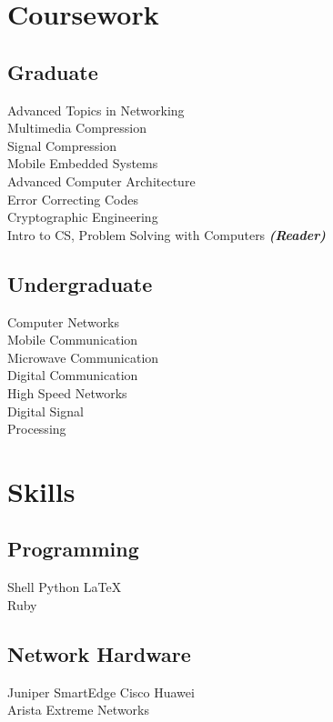 \documentclass[]{deedy-resume-openfont}
\begin{document}
\begin{minipage}[t]{0.33\textwidth}

\section{Coursework}
\subsection{Graduate}
Advanced Topics in Networking \\ Multimedia Compression \\ Signal Compression \\ Mobile Embedded Systems \\ Advanced Computer Architecture \\ Error Correcting Codes \\ Cryptographic Engineering \\
Intro to CS, Problem Solving with Computers {\footnotesize \textit{\textbf{(Reader) }}} \\
\sectionsep

\subsection{Undergraduate}
Computer Networks \\ Mobile Communication \\ Microwave Communication \\ Digital Communication \\ High Speed Networks \\ Digital Signal \\ Processing
\sectionsep


\section{Skills}
\subsection{Programming}
Shell \textbullet{} Python \textbullet{} \LaTeX\ \\
Ruby
\subsection{Network Hardware}
Juniper \textbullet{} SmartEdge \textbullet{} Cisco \textbullet{} Huawei \\ \textbullet{} Arista \textbullet{} Extreme Networks
\sectionsep

%
%

\end{minipage} 
\end{document}
